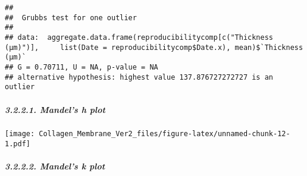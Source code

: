 \documentclass[
]{article}
\newenvironment{Shaded}{\begin{snugshade}}{\end{snugshade}}
\newcommand{\AttributeTok}[1]{\textcolor[rgb]{0.77,0.63,0.00}{#1}}
\newcommand{\DecValTok}[1]{\textcolor[rgb]{0.00,0.00,0.81}{#1}}
\newcommand{\FloatTok}[1]{\textcolor[rgb]{0.00,0.00,0.81}{#1}}
\newcommand{\FunctionTok}[1]{\textcolor[rgb]{0.00,0.00,0.00}{#1}}
\newcommand{\NormalTok}[1]{#1}
\newcommand{\OtherTok}[1]{\textcolor[rgb]{0.56,0.35,0.01}{#1}}
\newcommand{\SpecialCharTok}[1]{\textcolor[rgb]{0.00,0.00,0.00}{#1}}
\newcommand{\StringTok}[1]{\textcolor[rgb]{0.31,0.60,0.02}{#1}}
\begin{document}
\begin{verbatim}
## 
##  Grubbs test for one outlier
## 
## data:  aggregate.data.frame(reproducibilitycomp[c("Thickness (μm)")],     list(Date = reproducibilitycomp$Date.x), mean)$`Thickness (μm)`
## G = 0.70711, U = NA, p-value = NA
## alternative hypothesis: highest value 137.876727272727 is an outlier
\end{verbatim}

\hypertarget{mandels-h-plot-1}{%
\subparagraph{3.2.2.1. Mandel's h plot}\label{mandels-h-plot-1}}

\begin{Shaded}
\end{Shaded}

\texttt{[image: Collagen\_Membrane\_Ver2\_files/figure-latex/unnamed-chunk-12-1.pdf]}

\hypertarget{mandels-k-plot-1}{%
\subparagraph{3.2.2.2. Mandel's k plot}\label{mandels-k-plot-1}}

\begin{Shaded}
\end{Shaded}
\end{document}
